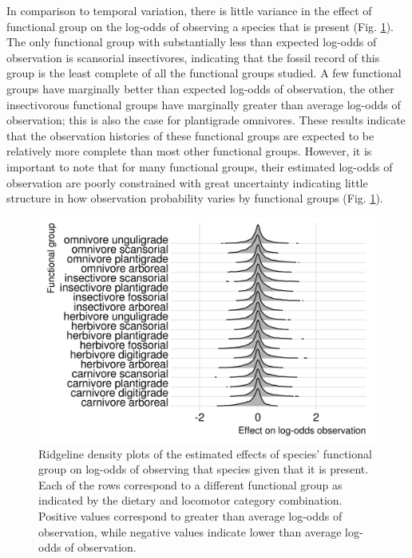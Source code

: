 \documentclass[12pt,letterpaper]{article}
\begin{document}
In comparison to temporal variation, there is little variance in the effect of functional group on the log-odds of observing a species that is present (Fig. \ref{fig:fg_observe}). The only functional group with substantially less than expected log-odds of observation is scansorial insectivores, indicating that the fossil record of this group is the least complete of all the functional groups studied. A few functional groups have marginally better than expected log-odds of observation, the other insectivorous functional groups have marginally greater than average log-odds of observation; this is also the case for plantigrade omnivores. These results indicate that the observation histories of these functional groups are expected to be relatively more complete than most other functional groups. However, it is important to note that for many functional groups, their estimated log-odds of observation are poorly constrained with great uncertainty indicating little structure in how observation probability varies by functional groups (Fig. \ref{fig:fg_observe}).
\begin{figure}[ht]
  \centering
  \includegraphics[width=\textwidth,height=0.4\textheight,keepaspectratio=true]{figure/ecotype_observation}
  \caption{Ridgeline density plots of the estimated effects of species' functional group on log-odds of observing that species given that it is present. Each of the rows correspond to a different functional group as indicated by the dietary and locomotor category combination. Positive values correspond to greater than average log-odds of observation, while negative values indicate lower than average log-odds of observation.}
  \label{fig:fg_observe}
\end{figure}
\end{document}
